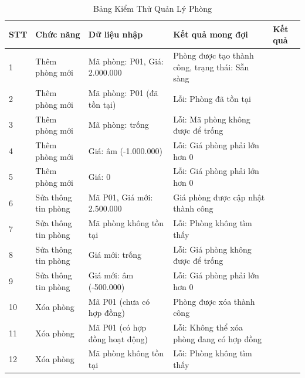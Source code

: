 \documentclass[12pt,a4paper]{article}
\begin{document}
\begin{table}[h!]
    \centering
    \caption{Bảng Kiểm Thử Quản Lý Phòng}
    \label{tab:room_management}
    \vspace{2mm}

    \begin{small}
    \begin{tabularx}{\textwidth}{|p{0.8cm}|p{2.5cm}|p{3cm}|p{3cm}|p{2.5cm}|}
    \hline
    \textbf{STT} & \textbf{Chức năng} & \textbf{Dữ liệu nhập} & \textbf{Kết quả mong đợi} & \textbf{Kết quả} \\ \hline

    1 & Thêm phòng mới & Mã phòng: P01, Giá: 2.000.000 & Phòng được tạo thành công, trạng thái: Sẵn sàng & \\ \hline

    2 & Thêm phòng mới & Mã phòng: P01 (đã tồn tại) & Lỗi: Phòng đã tồn tại & \\ \hline

    3 & Thêm phòng mới & Mã phòng: trống & Lỗi: Mã phòng không được để trống & \\ \hline

    4 & Thêm phòng mới & Giá: âm (-1.000.000) & Lỗi: Giá phòng phải lớn hơn 0 & \\ \hline

    5 & Thêm phòng mới & Giá: 0 & Lỗi: Giá phòng phải lớn hơn 0 & \\ \hline

    6 & Sửa thông tin phòng & Mã P01, Giá mới: 2.500.000 & Giá phòng được cập nhật thành công & \\ \hline

    7 & Sửa thông tin phòng & Mã phòng không tồn tại & Lỗi: Phòng không tìm thấy & \\ \hline

    8 & Sửa thông tin phòng & Giá mới: trống & Lỗi: Giá phòng không được để trống & \\ \hline

    9 & Sửa thông tin phòng & Giá mới: âm (-500.000) & Lỗi: Giá phòng phải lớn hơn 0 & \\ \hline

    10 & Xóa phòng & Mã P01 (chưa có hợp đồng) & Phòng được xóa thành công & \\ \hline

    11 & Xóa phòng & Mã P01 (có hợp đồng hoạt động) & Lỗi: Không thể xóa phòng đang có hợp đồng & \\ \hline

    12 & Xóa phòng & Mã phòng không tồn tại & Lỗi: Phòng không tìm thấy & \\ \hline


\end{tabularx}
\end{small}
\end{table}
\end{document}
